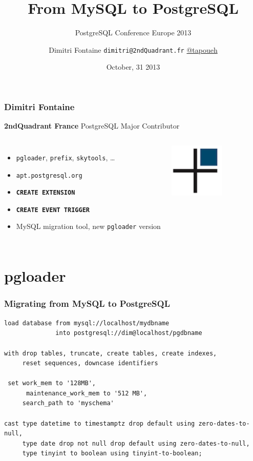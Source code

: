 \documentclass{beamer}
\title{From MySQL to PostgreSQL}
\subtitle{PostgreSQL Conference Europe 2013}
\author{Dimitri Fontaine \texttt{dimitri@2ndQuadrant.fr}
  \linebreak
  \url{@tapoueh}}
\date{October, 31 2013}
\begin{document}
\frame{\titlepage}

\begin{frame}[fragile]
  \frametitle{Dimitri Fontaine}

  \begin{center}
    \textbf{2ndQuadrant France}
    \linebreak
    PostgreSQL Major Contributor
  \end{center}
  \vfill

\begin{columns}[c]

  \begin{itemize}
   \item \texttt{pgloader}, \texttt{prefix}, \texttt{skytools}, …
   \item \texttt{apt.postgresql.org}
   \item \texttt{\textbf{CREATE EXTENSION}}
   \item \texttt{\textbf{CREATE EVENT TRIGGER}}
   \item MySQL migration tool, new \texttt{pgloader} version
  \end{itemize}  

\begin{center}
  \includegraphics[height=7em]{2ndQuadrant-cross.png}
\end{center}
\end{columns}
\end{frame}

\section{pgloader}

\begin{frame}[fragile]
  \frametitle{Migrating from MySQL to PostgreSQL}
  
  \vfill

\begin{verbatim}
load database from mysql://localhost/mydbname
              into postgresql://dim@localhost/pgdbname

with drop tables, truncate, create tables, create indexes,
     reset sequences, downcase identifiers

 set work_mem to '128MB',
      maintenance_work_mem to '512 MB',
     search_path to 'myschema'

cast type datetime to timestamptz drop default using zero-dates-to-null,
     type date drop not null drop default using zero-dates-to-null,
     type tinyint to boolean using tinyint-to-boolean;
\end{verbatim}
\end{frame}
\end{document}
